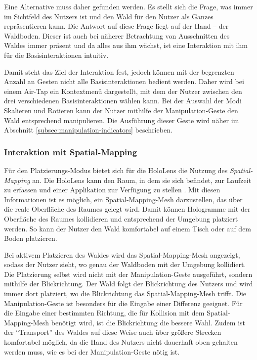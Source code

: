 Eine Alternative muss daher gefunden werden. Es stellt sich die Frage, was immer im Sichtfeld des Nutzers ist und den Wald für den Nutzer als Ganzes repräsentieren kann. Die Antwort auf diese Frage liegt auf der Hand -- der Waldboden. Dieser ist auch bei näherer Betrachtung von Ausschnitten des Waldes immer präsent und da alles aus ihm wächst, ist eine Interaktion mit ihm für die Basisinteraktionen intuitiv.

Damit steht das Ziel der Interaktion fest, jedoch können mit der begrenzten Anzahl an Gesten nicht alle Basisinteraktionen bedient werden. Daher wird bei einem Air-Tap ein Kontextmenü dargestellt, mit dem der Nutzer zwischen den drei verschiedenen Basisinteraktionen wählen kann. Bei der Auswahl der Modi Skalieren und Rotieren kann der Nutzer mithilfe der Manipulation-Geste den Wald entsprechend manipulieren. Die Ausführung dieser Geste wird näher im Abschnitt \ref{subsec:manipulation-indicators} beschrieben.

\subsubsection*{Interaktion mit Spatial-Mapping}
Für den Platzierungs-Modus bietet sich für die HoloLens die Nutzung des \textit{Spatial-Mapping} an. Die HoloLens kann den Raum, in dem sie sich befindet, zur Laufzeit zu erfassen und einer Applikation zur Verfügung zu stellen \cite{windows2017spacial}. Mit diesen Informationen ist es möglich, ein Spatial-Mapping-Mesh darzustellen, das über die reale Oberfläche des Raumes gelegt wird. Damit können Hologramme mit der Oberfläche des Raumes kollidieren und entsprechend der Umgebung platziert werden. So kann der Nutzer den Wald komfortabel auf einem Tisch oder auf dem Boden platzieren.

Bei aktivem Platzieren des Waldes wird das Spatial-Mapping-Mesh angezeigt, sodass der Nutzer sieht, wo genau der Waldboden mit der Umgebung kollidiert. Die Platzierung selbst wird nicht mit der Manipulation-Geste ausgeführt, sondern mithilfe der Blickrichtung. Der Wald folgt der Blickrichtung des Nutzers und wird immer dort platziert, wo die Blickrichtung das Spatial-Mapping-Mesh trifft. Die Manipulation-Geste ist besonders für die Eingabe einer Differenz geeignet. Für die Eingabe einer bestimmten Richtung, die für Kollision mit dem Spatial-Mapping-Mesh benötigt wird, ist die Blickrichtung die bessere Wahl. Zudem ist der "`Transport"' des Waldes auf diese Weise auch über größere Strecken komfortabel möglich, da die Hand des Nutzers nicht dauerhaft oben gehalten werden muss, wie es bei der Manipulation-Geste nötig ist.

